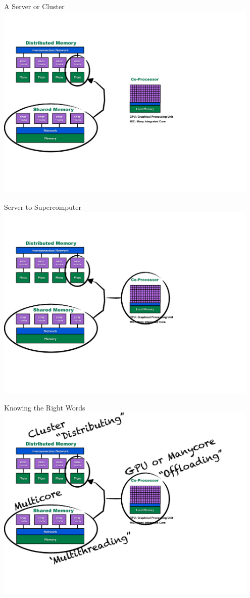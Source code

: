 \begin{frame}{A Server or Cluster}
\includegraphics[width=0.95\textwidth]
{../common/pics/hardware/ParallelHardware3.pdf}
\end{frame}

\begin{frame}{Server to Supercomputer}
\includegraphics[width=0.95\textwidth]
{../common/pics/hardware/ParallelHardware4.pdf}
\end{frame}

\begin{frame}{Knowing the Right Words}
\includegraphics[width=0.95\textwidth]
{../common/pics/hardware/ParallelHardware5.pdf}
\end{frame}

